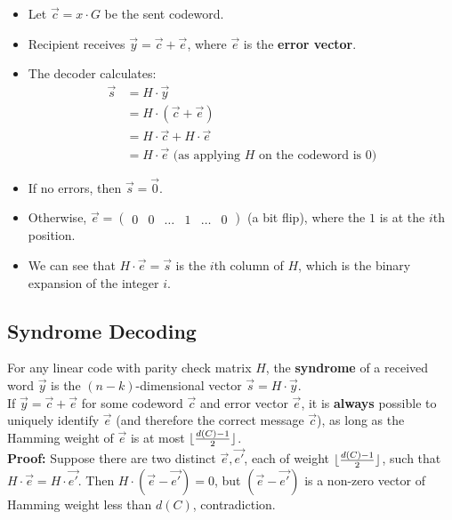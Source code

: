 \documentclass[11pt]{article}
\DeclarePairedDelimiter\floor{\lfloor}{\rfloor}
\begin{document}
\begin{itemize}
  \item Let $\overrightarrow{c} = x \cdot G$ be the sent codeword.
  \item Recipient receives $\overrightarrow{y} = \overrightarrow{c} + \overrightarrow{e}$, where $\overrightarrow{e}$ is the \textbf{error vector}.
  \item The decoder calculates:
    \begin{align*}
      \overrightarrow{s} &= H \cdot \overrightarrow{y} \\
      &= H \cdot (\overrightarrow{c} + \overrightarrow{e}) \\
      &= H \cdot \overrightarrow{c} + H \cdot \overrightarrow{e} \\
      &= H \cdot \overrightarrow{e} \text{ (as applying $H$ on the codeword is $0$)}
    \end{align*}
  \item If no errors, then $\overrightarrow{s} = \overrightarrow{0}$.
  \item Otherwise, $\overrightarrow{e} = \begin{pmatrix} 0 & 0 & \dots & 1 & \dots & 0 \end{pmatrix}$ (a bit flip), where the $1$ is at the $i$th position.
    \item We can see that $H \cdot \overrightarrow{e} = \overrightarrow{s}$ is the $i$th column of $H$, which is the binary expansion of the integer $i$.
\end{itemize}

\subsection{Syndrome Decoding}
For any linear code with parity check matrix $H$, the \textbf{syndrome} of a received word $\overrightarrow{y}$ is the $(n - k)$-dimensional vector $\overrightarrow{s} = H \cdot \overrightarrow{y}$. \\

If $\overrightarrow{y} = \overrightarrow{c} + \overrightarrow{e}$ for some codeword $\overrightarrow{c}$ and error vector $\overrightarrow{e}$, it is \textbf{always} possible to uniquely identify $\overrightarrow{e}$ (and therefore the correct message $\overrightarrow{c}$), as long as the Hamming weight of $\overrightarrow{e}$ is at most $\floor{\frac{d(C) - 1}{2}}$. \\

\textbf{Proof:}
Suppose there are two distinct $\overrightarrow{e}, \overrightarrow{e'}$, each of weight $\floor{\frac{d(C) - 1}{2}}$, such that $H \cdot \overrightarrow{e} = H \cdot \overrightarrow{e'}$.
Then $H \cdot (\overrightarrow{e} - \overrightarrow{e'}) = 0$, but $(\overrightarrow{e} - \overrightarrow{e'})$ is a non-zero vector of Hamming weight less than $d(C)$, contradiction. 
\end{document}
